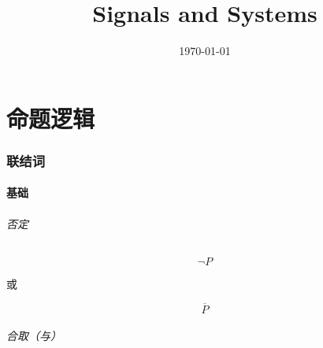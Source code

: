 \documentclass{article}
\title{Signals and Systems}
\author{}
\date{\today}
\begin{document}
\hypersetup{hidelinks,
    allcolors = black,
    breaklinks = true
}

\newtheorem{definition}{Definition}[subsection]
\newtheorem{theorem}{Theorem}[subsection]
\newtheorem{corollary}{Corollary}[theorem]
\renewcommand{\proofname}{\indent\bf Proof}

\def\e{\mathrm e}
\def\i{\mathrm i}
\def\j{\mathrm j}
\def\d{\mathrm d}
\def\C{\mathrm C}
\def\div{\mathrm{div}}
\def\rot{\mathrm{rot}}
\def\vecv{\vec{\mathrm v}}
\def\sr{\mathbb R}
\def\sn{\mathbb N}
\def\snp{\mathbb N^+}
\def\sc{\mathbb C}
\def\sz{\mathbb Z}
\def\impint{\int\limits_{-\infty}^{+\infty}}

\newcommand{\abs}[1]{\left|#1\right|}
\newcommand{\pare}[1]{\left(#1\right)}
\newcommand{\fourier}[1]{\mathscr F\pare{#1}}
\newcommand{\tfourier}[1]{\mathscr F^{-1}\pare{#1}}
\newcommand{\jacobi}[2]{\frac{\partial\pare{#1}}{\partial\pare{#2}}}

\begin{titlepage}
    \maketitle
\end{titlepage}

\tableofcontents
\newpage

\part{命题逻辑}

\section{联结词}

\subsection{基础}

\paragraph{否定}

\[\neg P\]

或

\[\overline P\]

\paragraph{合取（与）}
\end{document}
